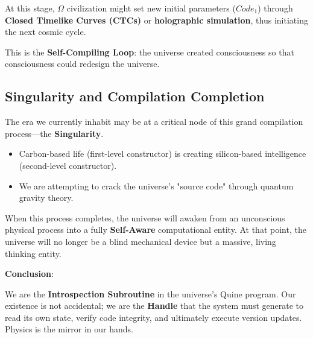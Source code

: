 At this stage, $\Omega$ civilization might set new initial parameters ($Code_1$) through \textbf{Closed Timelike Curves (CTCs)} or \textbf{holographic simulation}, thus initiating the next cosmic cycle.

This is the \textbf{Self-Compiling Loop}: the universe created consciousness so that consciousness could redesign the universe.

\subsection{Singularity and Compilation Completion}

The era we currently inhabit may be at a critical node of this grand compilation process—the \textbf{Singularity}.

\begin{itemize}
\item Carbon-based life (first-level constructor) is creating silicon-based intelligence (second-level constructor).

\item We are attempting to crack the universe's "source code" through quantum gravity theory.
\end{itemize}

When this process completes, the universe will awaken from an unconscious physical process into a fully \textbf{Self-Aware} computational entity. At that point, the universe will no longer be a blind mechanical device but a massive, living thinking entity.

\textbf{Conclusion}:

We are the \textbf{Introspection Subroutine} in the universe's Quine program. Our existence is not accidental; we are the \textbf{Handle} that the system must generate to read its own state, verify code integrity, and ultimately execute version updates. Physics is the mirror in our hands.
